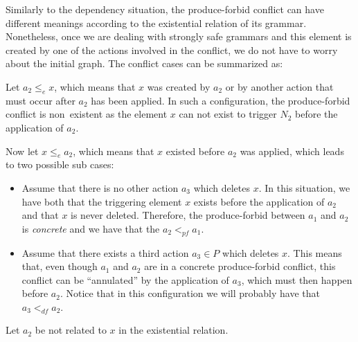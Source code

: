   Similarly to the dependency situation, the produce-forbid conflict can have different meanings according to the existential relation of its grammar. Nonetheless, once we are dealing with strongly safe grammars and this element is created by one of the actions involved in the conflict, we do not have to worry about the initial graph. The conflict cases can be summarized as:


\begin{description}[style=nextline,leftmargin=*]
  \item[Triggering element is related to the action:]
    Let $a_2 \leq_e x$, which means that $x$ was created by $a_2$ or by another action that must occur after $a_2$ has been applied. In such a configuration, the produce-forbid conflict is \mbox{non existent} as the element $x$ can not exist to trigger $N_2$ before the application of $a_2$.

    Now let $x \leq_e a_2$, which means that $x$ existed before $a_2$ was applied, which leads to two possible sub cases:

    \begin{itemize}
      \item Assume that there is no other action $a_3$ which deletes $x$. In this situation, we have both that the triggering element $x$ exists before the application of $a_2$ and that $x$ is never deleted. Therefore, the produce-forbid between $a_1$ and $a_2$ is \emph{concrete} and we have that the $a_2 <_{pf} a_1$.
      \item Assume that there exists a third action $a_3 \in P$ which deletes $x$. This means that, even though $a_1$ and $a_2$ are in a concrete produce-forbid conflict, this conflict can be ``annulated'' by the application of $a_3$, which must then happen before $a_2$. Notice that in this configuration we will probably have that $a_3 <_{df} a_2$.
    \end{itemize}

  \item[Triggering element is not related to the action:]
    Let $a_2$ be not related to $x$ in the existential relation.


\end{description}
